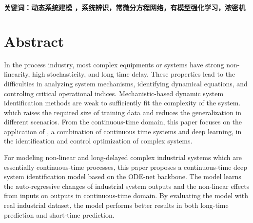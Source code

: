 
\vskip 30bp
{

    \textbf{ \heiti {} 关键词：动态系统建模 ，系统辨识，常微分方程网络，有模型强化学习，浓密机}
}



\chapter*{ Abstract }
In the process industry, most complex equipments or systems have strong non-linearity, high stochasticity, and long time delay.
These properties lead to the difficulties in analyzing system mechanisms, identifying dynamical equations, and controling critical operational indices. 
Mechanistic-based dynamic system identification methods are weak to sufficiently fit the complexity of the system.
which raises the required size of training data and reduces the generalization in different scenarios.
From the continuous-time domain, this paper focuses on the application of , a combination of continuous time systems and deep learning, in the identification and control optimization of complex systems.

For modeling non-linear and long-delayed complex industrial systems which are essentially continuous-time processes, this paper proposes a continuous-time deep system identification model based on the ODE-net backbone.
The model learns the auto-regressive changes of industrial system outputs and the non-linear effects from inputs on outputs in continuous-time domain. 
By evaluating the model with real industrial dataset, the model performs better results in both long-time prediction and short-time prediction.   

